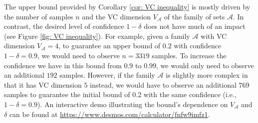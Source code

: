 The upper bound provided by Corollary \ref{cor: VC inequality} is mostly driven by the number of samples $n$ and the VC dimension $V_{\mathcal{A}}$ of the family of sets $\mathcal{A}$. In contrast, the desired level of confidence $1 - \delta$ does not have much of an impact (see Figure \ref{fig: VC inequality}). For example, given a family $\mathcal{A}$ with VC dimension $V_{\mathcal{A}} = 4$, to guarantee an upper bound of $0.2$ with confidence $1 - \delta = 0.9$, we would need to observe $n = 3319$ samples. To increase the confidence we have in this bound from $0.9$ to $0.99$, we would only need to observe an additional $192$ samples. However, if the family $\mathcal{A}$ is slightly more complex in that it has VC dimension $5$ instead, we would have to observe an additional $769$ samples to guarantee the initial bound of $0.2$ with the same confidence (i.e., $1 - \delta = 0.9$). An interactive demo illustrating the bound's dependence on $V_{\mathcal{A}}$ and $\delta$ can be found at \url{https://www.desmos.com/calculator/fnfw9imfz1}.
